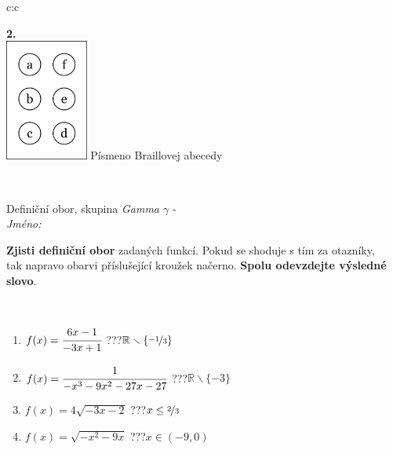 \documentclass[10pt]{report}
\begin{document}
\begin{tabular}{c:c}
\begin{minipage}[c][104.5mm][t]{0.5\linewidth}
\begin{center}
\begin{minipage}{0.20\linewidth}
\begin{center}
{\Huge\bfseries 2.} \\[2mm]
\includegraphics[height=40mm]{../images/braille.png}
{\small Písmeno Braillovej abecedy}
\end{center}
\end{minipage}
\end{center}
\end{minipage}
\\ \hdashline
\begin{minipage}[c][104.5mm][t]{0.5\linewidth}
\begin{center}
\vspace{7mm}
{\huge Definiční obor, skupina \textit{Gamma $\gamma$} -}\\[5mm]
\textit{Jméno:}\phantom{xxxxxxxxxxxxxxxxxxxxxxxxxxxxxxxxxxxxxxxxxxxxxxxxxxxxxxxxxxxxxxxxx}\\[5mm]
\begin{minipage}{0.95\linewidth}
\begin{center}
\textbf{Zjisti definiční obor} zadaných funkcí. Pokud se shoduje s tím za otazníky,\\tak napravo obarvi příslušející kroužek načerno. \textbf{Spolu odevzdejte výsledné slovo}.
\end{center}
\end{minipage}
\\[1mm]
\begin{minipage}{0.79\linewidth}
\begin{center}
\begin{varwidth}{\linewidth}
\begin{enumerate}
\normalsizerrr
\item $f(x)=\cfrac{6x-1}{-3x+1}$\quad \dotfill\; ???\;\dotfill \quad $\mathbb{R}\smallsetminus\{\nicefrac{-1}{3}\}$
\item $f(x)=\cfrac{1}{-x^3-9x^2-27x-27}$\quad \dotfill\; ???\;\dotfill \quad $\mathbb{R}\smallsetminus\{-3\}$
\item $f(x)=4\sqrt{-3x-2}$\quad \dotfill\; ???\;\dotfill \quad $x\leq\nicefrac{2}{3}$
\item $f(x)=\sqrt{-x^2-9x}$\quad \dotfill\; ???\;\dotfill \quad $x\in(-9 , 0)$

\end{enumerate}
\end{varwidth}
\end{center}
\end{minipage}
\end{center}
\end{minipage}
\end{tabular}
\end{document}
